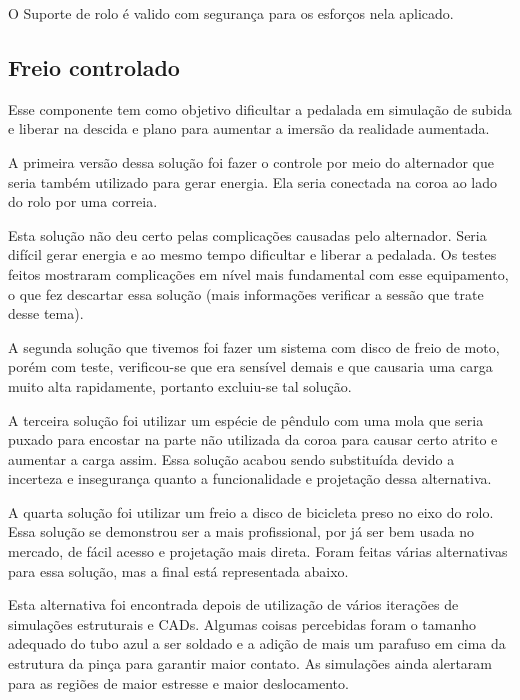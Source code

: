 O Suporte de rolo é valido com segurança para os esforços nela aplicado.

\subsection{Freio controlado} 
    Esse componente tem como objetivo dificultar a pedalada em simulação de subida e liberar na descida e plano para aumentar a imersão da realidade aumentada.

    A primeira versão dessa solução foi fazer o controle por meio do alternador que seria também utilizado para gerar energia. Ela seria conectada na coroa ao lado do rolo por uma correia.

    Esta solução não deu certo pelas complicações causadas pelo alternador. Seria difícil gerar energia e ao mesmo tempo dificultar e liberar a pedalada. Os testes feitos mostraram complicações em nível mais fundamental com esse equipamento, o que fez descartar essa solução (mais informações verificar a sessão que trate desse tema).

    A segunda solução que tivemos foi fazer um sistema com disco de freio de moto, porém com teste, verificou-se que era sensível demais e que causaria uma carga muito alta rapidamente, portanto excluiu-se tal solução.


    A terceira solução foi utilizar um espécie de pêndulo com uma mola que seria puxado para encostar na parte não utilizada da coroa para causar certo atrito e aumentar a carga assim. Essa solução acabou sendo substituída devido a incerteza e insegurança quanto a funcionalidade e projetação dessa alternativa.


    A quarta solução foi utilizar um freio a disco de bicicleta preso no eixo do rolo. Essa solução se demonstrou ser a mais profissional, por já ser bem usada no mercado, de fácil acesso e projetação mais direta. Foram feitas várias alternativas para essa solução, mas a final está representada abaixo.


    Esta alternativa foi encontrada depois de utilização de vários iterações de simulações estruturais e CADs. Algumas coisas percebidas foram o tamanho adequado do tubo azul a ser soldado e a adição de mais um parafuso em cima da estrutura da pinça para garantir maior contato.  As simulações ainda alertaram para as regiões de maior estresse e maior deslocamento.

